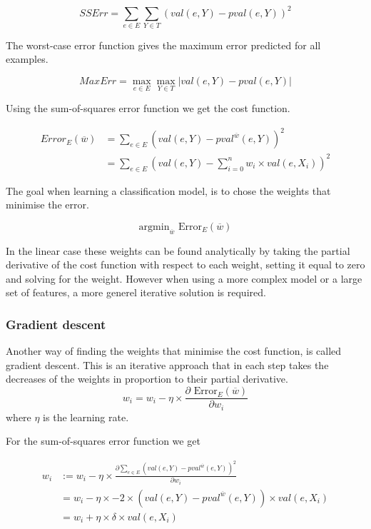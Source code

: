 \[ SSErr = \sum_{e \in E}\sum_{Y \in T} (val(e,Y) - pval(e,Y))^2 \]

The worst-case error function gives the maximum error predicted for all examples.

\[ MaxErr = \max_{e \in E}\max_{Y \in T} | val(e,Y) - pval(e,Y) | \]

\begin{flushright}
\cite[p. 290-291]{AI2010}
\end{flushright}

Using the sum-of-squares error function we get the cost function.

\begin{align*}
Error_E(\overline{w}) &= \sum_{e \in E} \left(val(e,Y)-pval^{\overline{w}}(e,Y)\right)^2 \\
&= \sum_{e \in E} \left(val(e,Y)-\sum_{i=0}^n w_i \times val(e,X_i)\right)^2
\end{align*}

The goal when learning a classification model, is to chose the weights that minimise the error.

\[ \text{argmin}_{\overline{w}} \text{ Error}_E(\overline{w}) \]

In the linear case these weights can be found analytically by taking the partial derivative of the cost function with respect 
to each weight, setting it equal to zero and solving for the weight.
However when using a more complex model or a large set of features, a more generel iterative solution is required.

\subsubsection{Gradient descent}\label{sec:gradient}

Another way of finding the weights that minimise the cost function, is called gradient descent.
This is an iterative approach that in each step takes the decreases of the weights in
proportion to their partial derivative.
\[ w_i = w_i - \eta \times \frac{\partial \text{ Error}_E(\overline{w})}{\partial w_i} \]
where $\eta$ is the learning rate.

For the sum-of-squares error function we get

\begin{align*}
w_i &:= w_i - \eta \times \frac{\partial \sum_{e \in E}\left(val(e,Y) - pval^{\overline{w}}(e,Y)\right)^2}{\partial w_i} \\ %
&= w_i - \eta \times -2 \times \left(val(e,Y) - pval^{\overline{w}}(e,Y)\right) \times val(e,X_i) \\
&= w_i + \eta \times \delta \times val(e,X_i)
\end{align*}

